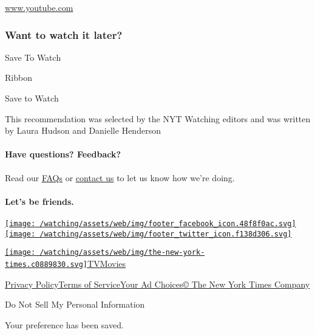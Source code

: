 \href{http://www.youtube.com}{www.youtube.com}

\hypertarget{want-to-watch-it-later}{%
\subsubsection{Want to watch it later?}\label{want-to-watch-it-later}}

Save To Watch

Ribbon

Save to Watch

This recommendation was selected by the NYT Watching editors and was
written by Laura Hudson and Danielle Henderson

\hypertarget{have-questions-feedback}{%
\paragraph{Have questions? Feedback?}\label{have-questions-feedback}}

Read our \href{//www.nytimes.com/2017/01/10/watching/faq.html}{FAQs} or
\href{mailto:watchingcare@nytimes.com}{contact us} to let us know how
we're doing.

\hypertarget{lets-be-friends}{%
\paragraph{Let's be friends.}\label{lets-be-friends}}

\href{https://www.facebook.com/nytwatching/}{\texttt{[image: /watching/assets/web/img/footer\_facebook\_icon.48f8f0ac.svg]}}\href{https://twitter.com/watching}{\texttt{[image: /watching/assets/web/img/footer\_twitter\_icon.f138d306.svg]}}

\href{//www.nytimes.com}{\texttt{[image: /watching/assets/web/img/the-new-york-times.c0889830.svg]}}\href{//www.nytimes.com/section/arts/television}{TV}\href{//www.nytimes.com/section/movies}{Movies}

\href{//www.nytimes.com/content/help/rights/privacy/policy/privacy-policy.html}{Privacy
Policy}\href{//www.nytimes.com/content/help/rights/terms/terms-of-service.html}{Terms
of
Service}\href{//www.nytimes.com/content/help/rights/privacy/policy/privacy-policy.html\#pp}{Your
Ad Choices}\href{http://www.nytco.com/}{© The New York Times Company}

Do Not Sell My Personal Information

Your preference has been saved.
